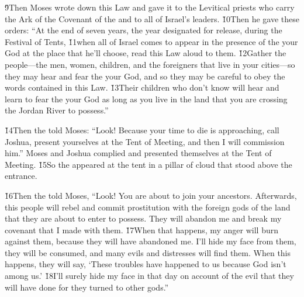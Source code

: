 \v{9}Then Moses wrote down this Law and gave it to the Levitical priests who carry the Ark of the Covenant of the  and to all of Israel's leaders. \v{10}Then he gave these orders: ``At the end of seven years, the year designated for release, during the Festival of Tents, \v{11}when all of Israel comes to appear in the presence of the  your God at the place that he'll choose, read this Law aloud to them. \v{12}Gather the people---the men, women, children, and the foreigners that live in your cities---so they may hear and fear the  your God, and so they may be careful to obey the words contained in this Law. \v{13}Their children who don't know will hear and learn to fear the  your God as long as you live in the land that you are crossing the Jordan River to possess.''

\v{14}Then the  told Moses: ``Look! Because your time to die is approaching, call Joshua, present yourselves at the Tent of Meeting, and then I will commission him.'' Moses and Joshua complied and presented themselves at the Tent of Meeting. \v{15}So the  appeared at the tent in a pillar of cloud that stood above the entrance.

\v{16}Then the  told Moses, ``Look! You are about to join your ancestors. Afterwards, this people will rebel and commit prostitution with the foreign gods of the land that they are about to enter to possess. They will abandon me and break my covenant that I made with them. \v{17}When that happens, my anger will burn against them, because they will have abandoned me. I'll hide my face from them, they will be consumed, and many evils and distresses will find them. When this happens, they will say, `These troubles have happened to us because God isn't among us.' \v{18}I'll surely hide my face in that day on account of the evil that they will have done for they turned to other gods.''

